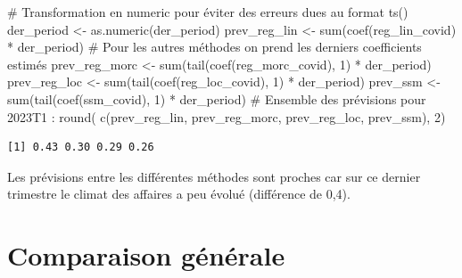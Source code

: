 \documentclass[
  a4paper,
  DIV=11,
  numbers=noendperiod,
  french]{scrartcl}
\newenvironment{Shaded}{\begin{snugshade}}{\end{snugshade}}
\newcommand{\CommentTok}[1]{\textcolor[rgb]{0.37,0.37,0.37}{#1}}
\newcommand{\DecValTok}[1]{\textcolor[rgb]{0.68,0.00,0.00}{#1}}
\newcommand{\FunctionTok}[1]{\textcolor[rgb]{0.28,0.35,0.67}{#1}}
\newcommand{\NormalTok}[1]{\textcolor[rgb]{0.00,0.23,0.31}{#1}}
\newcommand{\OtherTok}[1]{\textcolor[rgb]{0.00,0.23,0.31}{#1}}
\newcommand{\SpecialCharTok}[1]{\textcolor[rgb]{0.37,0.37,0.37}{#1}}
\newcommand\1{{\mathds 1}}
\theoremstyle{remark}
\begin{document}
\begin{Shaded}
\begin{Highlighting}[]
\CommentTok{\# Transformation en numeric pour éviter des erreurs dues au format ts()}
\NormalTok{der\_period }\OtherTok{\textless{}{-}} \FunctionTok{as.numeric}\NormalTok{(der\_period)}
\NormalTok{prev\_reg\_lin }\OtherTok{\textless{}{-}} \FunctionTok{sum}\NormalTok{(}\FunctionTok{coef}\NormalTok{(reg\_lin\_covid) }\SpecialCharTok{*}\NormalTok{ der\_period)}
\CommentTok{\# Pour les autres méthodes on prend les derniers coefficients estimés}
\NormalTok{prev\_reg\_morc }\OtherTok{\textless{}{-}} \FunctionTok{sum}\NormalTok{(}\FunctionTok{tail}\NormalTok{(}\FunctionTok{coef}\NormalTok{(reg\_morc\_covid), }\DecValTok{1}\NormalTok{) }\SpecialCharTok{*}\NormalTok{ der\_period)}
\NormalTok{prev\_reg\_loc }\OtherTok{\textless{}{-}} \FunctionTok{sum}\NormalTok{(}\FunctionTok{tail}\NormalTok{(}\FunctionTok{coef}\NormalTok{(reg\_loc\_covid), }\DecValTok{1}\NormalTok{) }\SpecialCharTok{*}\NormalTok{ der\_period)}
\NormalTok{prev\_ssm }\OtherTok{\textless{}{-}} \FunctionTok{sum}\NormalTok{(}\FunctionTok{tail}\NormalTok{(}\FunctionTok{coef}\NormalTok{(ssm\_covid), }\DecValTok{1}\NormalTok{) }\SpecialCharTok{*}\NormalTok{ der\_period)}
\CommentTok{\# Ensemble des prévisions pour 2023T1 :}
\FunctionTok{round}\NormalTok{(}
  \FunctionTok{c}\NormalTok{(prev\_reg\_lin, prev\_reg\_morc, prev\_reg\_loc, prev\_ssm), }
  \DecValTok{2}\NormalTok{)}
\end{Highlighting}
\end{Shaded}

\begin{verbatim}
[1] 0.43 0.30 0.29 0.26
\end{verbatim}

Les prévisions entre les différentes méthodes sont proches car sur ce
dernier trimestre le climat des affaires a peu évolué (différence de
0,4).

\section{Comparaison générale}\label{sec-comp-generales}
\end{document}
